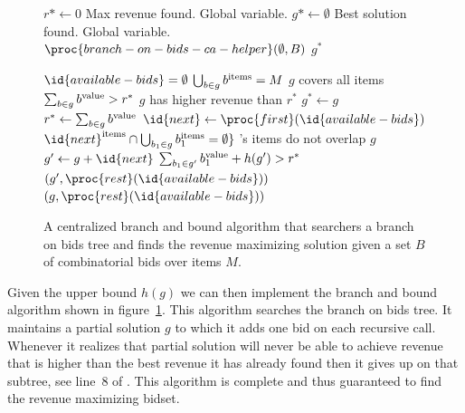 \begin{figure}
  \begin{minipage}{1.0\linewidth}
    \begin{codebox}
      \li $r* \gets 0$ \>\>\>\Comment Max revenue found. Global variable.
      \li $g* \gets \emptyset$ \>\>\>\Comment Best solution found. Global
      variable.
      \li $\proc{branch-on-bids-ca-helper}(\emptyset,B)$
      \li \Return $g^*$
    \end{codebox}
    \begin{codebox}
    \li \If $\id{available-bids} = \emptyset$
    \li \Then \Return
        \End
    \li \If $\bigcup_{b \in g} b^{\text{items}} = M$   \>\>\>\>\>\>\>\>\>\>\> \Comment $g$
    covers all items
    \li \Then \If $\sum_{b \in g} b^{\text{value}} > r^*$ \>\>\>\>\>\>\>\>\>
    \Comment $g$ has higher revenue than $r^*$
    \li       \Then $g^* \gets g$
    \li             $r^* \gets \sum_{b \in g} b^{\text{value}}$
              \End
    \li       \Return
        \End
    \li $\id{next} \gets \proc{first}(\id{available-bids})$
    \li \If $\id{next}^{\text{items}} \cap \bigcup_{\bidp \in g}
    \bidpi = \emptyset\} $ \>\>\>\>\>\>\>\>\>\>\> \Comment {}'s
    items do not overlap $g$
    \li \Then $g' \gets g + \id{next}$
    \li     \If  $\sum_{b_1 \in g'} b_1^{\text{value}} + h(g') > r^*$
    \li     \Then {}$(g',\proc{rest}(\id{available-bids}))$
            \End
         \End
    \li {}$(g,\proc{rest}(\id{available-bids}))$
    
  \end{codebox}
  \end{minipage}
  \caption{A centralized branch and bound algorithm that searchers a
    branch on bids tree and finds the revenue maximizing solution
    given a set $B$ of combinatorial bids over items $M$.}
  \label{fig:bb-ca}
\end{figure}

Given the upper bound $h(g)$ we can then implement the branch and
bound algorithm shown in figure~\ref{fig:bb-ca}. This algorithm
searches the branch on bids tree. It maintains a partial solution $g$
to which it adds one bid on each recursive call.  Whenever it realizes
that partial solution will never be able to achieve revenue that
is higher than the best revenue it has already found then it gives up
on that subtree, see line~8 of . This
algorithm is complete and thus guaranteed to find the revenue
maximizing bidset.

